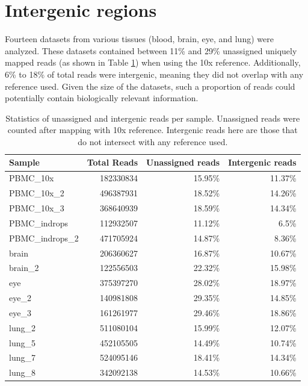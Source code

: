 \section{Intergenic regions}

Fourteen datasets from various tissues (blood, brain, eye, and lung) were analyzed.
These datasets contained between 11\% and 29\% unassigned uniquely mapped reads (as shown in Table \ref{tab:countStats})
when using the 10x reference.
Additionally, 6\% to 18\% of total reads were intergenic, meaning they did not overlap with any reference used.
Given the size of the datasets, such a proportion of reads could potentially contain biologically relevant information.

\begin{table}[h]
    \centering
    \begin{tabular}{l|rrr}
        \toprule
        Sample & Total Reads & Unassigned reads & Intergenic reads \\
        \midrule
        PBMC\_10x & 182330834 & 15.95\% & 11.37\% \\
        PBMC\_10x\_2 & 496387931 & 18.52\% & 14.26\% \\
        PBMC\_10x\_3 & 368640939 & 18.59\% & 14.34\% \\
        PBMC\_indrops & 112932507 & 11.12\% & 6.5\% \\
        PBMC\_indrops\_2 & 471705924 & 14.87\% & 8.36\% \\
        brain & 206360627 & 16.87\% & 10.67\% \\
        brain\_2 & 122556503 & 22.32\% & 15.98\% \\
        eye & 375397270 & 28.02\% & 18.97\% \\
        eye\_2 & 140981808 & 29.35\% & 14.85\% \\
        eye\_3 & 161261977 & 29.46\% & 18.86\% \\
        lung\_2 & 511080104 & 15.99\% & 12.07\% \\
        lung\_5 & 452105505 & 14.49\% & 10.74\% \\
        lung\_7 & 524095146 & 18.41\% & 14.34\% \\
        lung\_8 & 342092138 & 14.53\% & 10.66\% \\
        \bottomrule
    \end{tabular}
    \caption{Statistics of unassigned and intergenic reads per sample.
    Unassigned reads were counted after mapping with 10x reference.
    Intergenic reads here are those that do not intersect with any reference used.}
    \label{tab:countStats}
\end{table}


